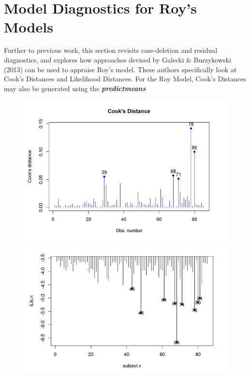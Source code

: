 \documentclass[12pt, a4paper]{report}
\theoremstyle{plain}
\theoremstyle{definition}
\theoremstyle{remark}
\begin{document}
\section{Model Diagnostics for Roy's Models}


Further to previous work, this section revisits case-deletion and residual diagnostics, and explores how approaches devised by  Galecki \& Burzykowski (2013) can be used to appraise Roy's model. These authors specifically look at Cook's Distances and Likelihood Distances.
For the Roy Model, Cook's Distances may also be generated using the \textbf{\textit{predictmeans}}



\begin{figure}[h!]
	\centering
	\includegraphics[width=0.7\linewidth]{images/CooksDistancePlot-JS-Roy}
	\caption{}
	\label{fig:CooksDistancePlot-JS-Roy}
\end{figure}

\begin{figure}[h!]
	\centering
	\includegraphics[width=0.7\linewidth]{images/LogLik-JS-Roy}
	\caption{}
	\label{fig:LogLik-JS-Roy}
\end{figure}
\end{document}
